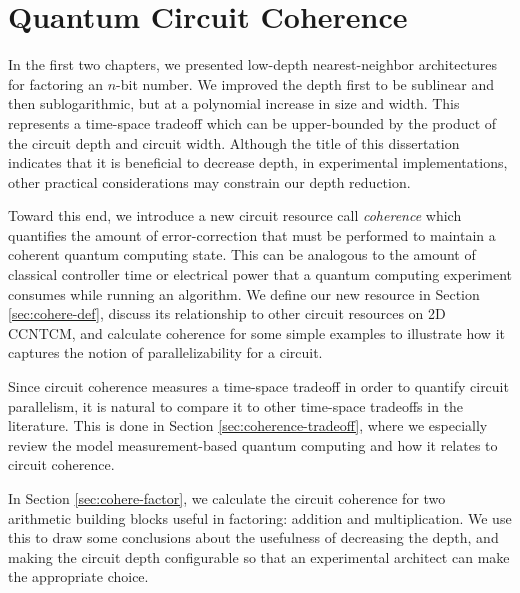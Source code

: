\chapter{Quantum Circuit Coherence}
\label{chap:coherence}

In the first two chapters, we presented low-depth nearest-neighbor
architectures for factoring an $n$-bit number. We improved the depth first to
be sublinear and then sublogarithmic, but at a polynomial increase in size
and width. This represents a time-space tradeoff which can be upper-bounded
by the product of the circuit depth and circuit width. Although the title of
this dissertation indicates that it is beneficial to decrease depth, in
experimental implementations, other practical considerations may constrain
our depth reduction.

Toward this end, we introduce a new circuit resource call \emph{coherence}
which quantifies the amount of error-correction that must be performed
to maintain a coherent quantum computing state. This can be analogous to
the amount of classical controller time or electrical power that a
quantum computing experiment consumes while running an algorithm. We
define our new resource in Section \ref{sec:cohere-def}, discuss its
relationship to other circuit resources on \textsf{2D CCNTCM}, and
calculate coherence for some simple examples to illustrate how it
captures the notion of parallelizability for a circuit.

Since circuit coherence measures a time-space tradeoff in order to
quantify circuit parallelism, it is natural to
compare it to other time-space tradeoffs in the literature.
This is done in Section \ref{sec:coherence-tradeoff}, where we
especially review the model measurement-based quantum computing and
how it relates to circuit coherence.

In Section \ref{sec:cohere-factor}, we calculate the circuit coherence
for two arithmetic building blocks useful in factoring: addition
and multiplication. We use this to draw some conclusions about the
usefulness of decreasing the depth, and making the circuit depth configurable
so that an experimental architect can make the appropriate choice.










%

%